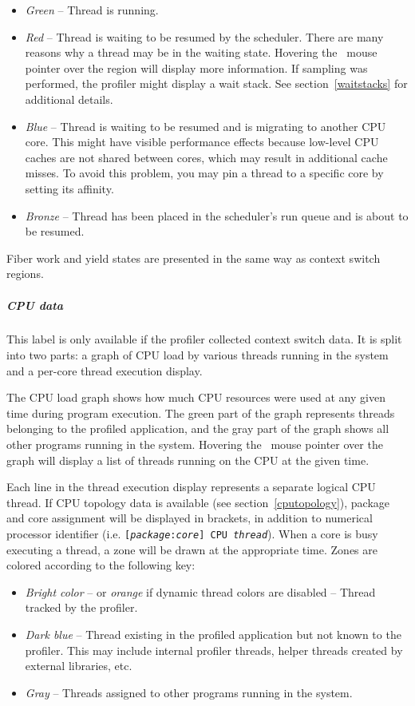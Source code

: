\documentclass[hidelinks,titlepage,a4paper,twoside]{article}
\begin{document}
\begin{itemize}
\item \emph{Green} -- Thread is running.
\item \emph{Red} -- Thread is waiting to be resumed by the scheduler. There are many reasons why a thread may be in the waiting state. Hovering the \faMousePointer{}~mouse pointer over the region will display more information. If sampling was performed, the profiler might display a wait stack. See section~\ref{waitstacks} for additional details.
\item \emph{Blue} -- Thread is waiting to be resumed and is migrating to another CPU core. This might have visible performance effects because low-level CPU caches are not shared between cores, which may result in additional cache misses. To avoid this problem, you may pin a thread to a specific core by setting its affinity.
\item \emph{Bronze} -- Thread has been placed in the scheduler's run queue and is about to be resumed.
\end{itemize}

Fiber work and yield states are presented in the same way as context switch regions.

\subparagraph{CPU data}

This label is only available if the profiler collected context switch data. It is split into two parts: a graph of CPU load by various threads running in the system and a per-core thread execution display.

The CPU load graph shows how much CPU resources were used at any given time during program execution. The green part of the graph represents threads belonging to the profiled application, and the gray part of the graph shows all other programs running in the system. Hovering the \faMousePointer{}~mouse pointer over the graph will display a list of threads running on the CPU at the given time.

Each line in the thread execution display represents a separate logical CPU thread. If CPU topology data is available (see section~\ref{cputopology}), package and core assignment will be displayed in brackets, in addition to numerical processor identifier (i.e. \texttt{[\emph{package}:\emph{core}] CPU \emph{thread}}). When a core is busy executing a thread, a zone will be drawn at the appropriate time. Zones are colored according to the following key:

\begin{itemize}
\item \emph{Bright color} -- or \emph{orange} if dynamic thread colors are disabled -- Thread tracked by the profiler.
\item \emph{Dark blue} -- Thread existing in the profiled application but not known to the profiler. This may include internal profiler threads, helper threads created by external libraries, etc.
\item \emph{Gray} -- Threads assigned to other programs running in the system.
\end{itemize}
\end{document}
